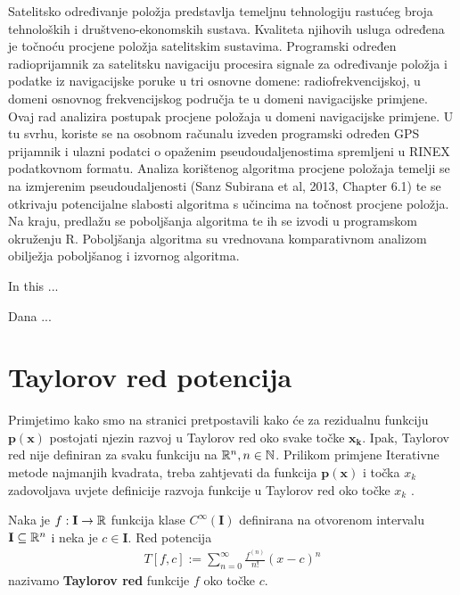 \documentclass[a4paper,twoside,12pt]{memoir} %
\begin{document}
\begin{sazetak}
Satelitsko određivanje položja predstavlja temeljnu
tehnologiju rastućeg broja tehnoloških i društveno-ekonomskih sustava.
Kvaliteta njihovih
usluga određena je točnoću procjene položja
satelitskim sustavima.
Programski određen radioprijamnik za satelitsku navigaciju
procesira signale za određivanje položja i podatke
iz navigacijske poruke
u tri osnovne domene: radiofrekvencijskoj, u domeni osnovnog frekvencijskog
područja te u domeni navigacijske primjene.
Ovaj rad analizira postupak procjene položaja
u domeni navigacijske primjene. U tu svrhu, koriste se na osobnom računalu
izveden programski određen GPS prijamnik i ulazni podatci
o opaženim pseudoudaljenostima spremljeni
u RINEX podatkovnom formatu.
Analiza korištenog algoritma procjene položaja
temelji se na izmjerenim pseudoudaljenosti (Sanz Subirana et al, 2013, Chapter 6.1)
te se otkrivaju potencijalne slabosti algoritma
s učincima na točnost procjene položja. Na kraju, predlažu se poboljšanja
algoritma te ih se izvodi u programskom okruženju R. 
Poboljšanja algoritma su vrednovana komparativnom analizom obilježja
poboljšanog i izvornog algoritma.
\end{sazetak}

\begin{summary}
In this ...
\end{summary}


\begin{cv}
Dana ...
\end{cv}

\appendix

\chapter{Taylorov red potencija}\label{appendix:aTay}
Primjetimo kako smo na stranici \pageref{stranica:NGLin} pretpostavili
kako će za rezidualnu funkciju $\mathbf{p}(\mathbf{x})$ postojati njezin 
razvoj u Taylorov red oko svake točke $\mathbf{x_k}$. Ipak,
Taylorov red nije definiran za svaku funkciju na $\mathbb{R}^n, n \in \mathbb{N}$.
Prilikom primjene Iterativne metode najmanjih kvadrata, treba zahtjevati da 
funkcija $\mathbf{p}(\mathbf{x})$ i točka $x_k$ zadovoljava uvjete definicije razvoja funkcije u Taylorov red oko točke $x_k$ \cite{math:tay}.
\begin{defn}
	Naka je $f: \mathbf{I} \to \mathbb{R} $ funkcija klase $C^\infty(\mathbf{I})$ definirana
	na otvorenom intervalu $\mathbf{I} \subseteq \mathbb{R}^n$ i neka je $c \in \mathbf{I}$.
	Red potencija
	\begin{align}
	T \left[f,c\right] := \sum_{n=0}^{\infty} \frac{f^{(n)}}{n!} \left(x - c\right)^n
	\end{align}
	nazivamo \textbf{Taylorov red} funkcije $f$ oko točke $c$.
\end{defn}%
\end{document}
